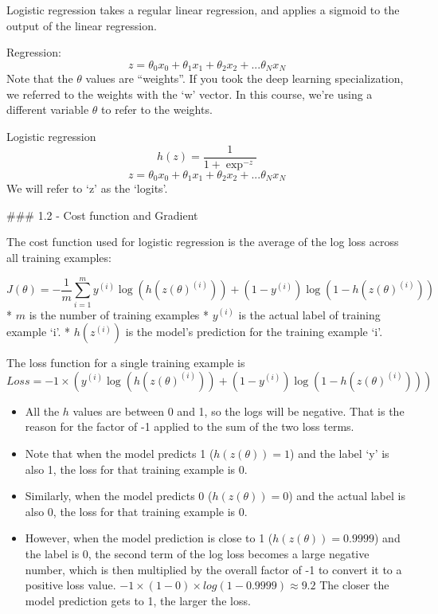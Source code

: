 \documentclass[11pt]{article}
\providecommand{\tightlist}{%
      \setlength{\itemsep}{0pt}\setlength{\parskip}{0pt}}
\begin{document}
Logistic regression takes a regular linear regression, and applies a
sigmoid to the output of the linear regression.

Regression:
\[z = \theta_0 x_0 + \theta_1 x_1 + \theta_2 x_2 + ... \theta_N x_N\]
Note that the \(\theta\) values are ``weights''. If you took the deep
learning specialization, we referred to the weights with the `w' vector.
In this course, we're using a different variable \(\theta\) to refer to
the weights.

Logistic regression \[ h(z) = \frac{1}{1+\exp^{-z}}\]
\[z = \theta_0 x_0 + \theta_1 x_1 + \theta_2 x_2 + ... \theta_N x_N\] We
will refer to `z' as the `logits'.

    \#\#\# 1.2 - Cost function and Gradient

The cost function used for logistic regression is the average of the log
loss across all training examples:

\[J(\theta) = -\frac{1}{m} \sum_{i=1}^m y^{(i)}\log (h(z(\theta)^{(i)})) + (1-y^{(i)})\log (1-h(z(\theta)^{(i)}))\tag{5} \]
* \(m\) is the number of training examples * \(y^{(i)}\) is the actual
label of training example `i'. * \(h(z^{(i)})\) is the model's
prediction for the training example `i'.

The loss function for a single training example is
\[ Loss = -1 \times \left( y^{(i)}\log (h(z(\theta)^{(i)})) + (1-y^{(i)})\log (1-h(z(\theta)^{(i)})) \right)\]

\begin{itemize}
\tightlist
\item
  All the \(h\) values are between 0 and 1, so the logs will be
  negative. That is the reason for the factor of -1 applied to the sum
  of the two loss terms.
\item
  Note that when the model predicts 1 (\(h(z(\theta)) = 1\)) and the
  label `y' is also 1, the loss for that training example is 0.
\item
  Similarly, when the model predicts 0 (\(h(z(\theta)) = 0\)) and the
  actual label is also 0, the loss for that training example is 0.
\item
  However, when the model prediction is close to 1
  (\(h(z(\theta)) = 0.9999\)) and the label is 0, the second term of the
  log loss becomes a large negative number, which is then multiplied by
  the overall factor of -1 to convert it to a positive loss value.
  \(-1 \times (1 - 0) \times log(1 - 0.9999) \approx 9.2\) The closer
  the model prediction gets to 1, the larger the loss.
\end{itemize}
\end{document}
